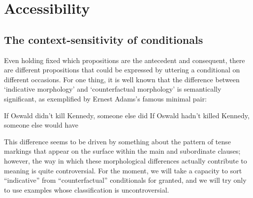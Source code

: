 \documentclass[If.tex]{subfiles}
\begin{document}
 
\chapter{Accessibility}\label{chap:accessibility}
\section{The context-sensitivity of conditionals} \label{sect:context}
Even holding fixed which propositions are the antecedent and consequent, there are different propositions that could be expressed by uttering a conditional on different occasions. For one thing, it is well known that the difference between ‘indicative morphology’ and ‘counterfactual morphology’ is semantically significant, as exemplified by Ernest Adams's famous minimal pair:
\begin{prop}
	\nitem	
	\begin{prop}
		\aitem \label{indoswald}
			If Oswald didn't kill Kennedy, someone else did
		\aitem \label{cfoswald}
			If Oswald hadn't killed Kennedy, someone else would have
	\end{prop}
\end{prop}
This difference seems to be driven by something about the pattern of tense markings that appear on the surface within the main and subordinate clauses; however, the way in which these morphological differences actually contribute to meaning is quite controversial. For the moment, we will take a capacity to sort “indicative” from “counterfactual” conditionals for granted, and we will try only to use examples whose classification is uncontroversial.
\end{document}
